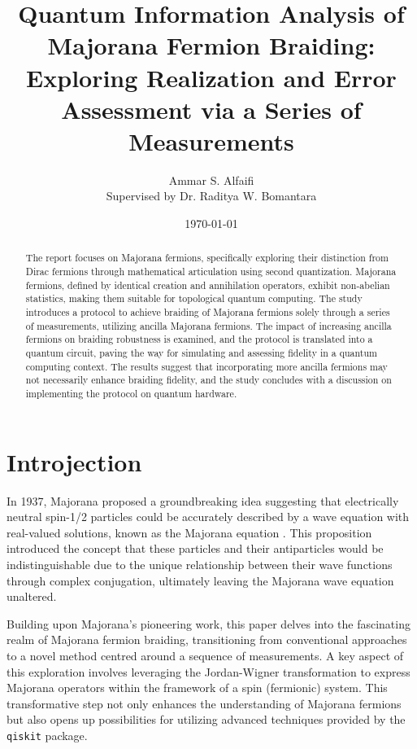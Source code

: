 \documentclass{article}
\title{Quantum Information Analysis of Majorana Fermion Braiding: Exploring Realization and Error Assessment via a Series of Measurements}
\author{Ammar S. Alfaifi \\ Supervised by Dr. Raditya W. Bomantara}
\date{\today}
\def\c#1{\texttt{#1}}
\begin{document}
\maketitle

\begin{abstract}
The report focuses on Majorana fermions, specifically exploring their distinction from Dirac fermions through mathematical articulation using second quantization. Majorana fermions, defined by identical creation and annihilation operators, exhibit non-abelian statistics, making them suitable for topological quantum computing. The study introduces a protocol to achieve braiding of Majorana fermions solely through a series of measurements, utilizing ancilla Majorana fermions. The impact of increasing ancilla fermions on braiding robustness is examined, and the protocol is translated into a quantum circuit, paving the way for simulating and assessing fidelity in a quantum computing context. The results suggest that incorporating more ancilla fermions may not necessarily enhance braiding fidelity, and the study concludes with a discussion on implementing the protocol on quantum hardware.
\end{abstract}

\section{Introjection} %
In 1937, Majorana proposed a groundbreaking idea suggesting that electrically neutral spin-1/2 particles could be accurately described by a wave equation with real-valued solutions, known as the Majorana equation \cite{Majorana2006}. This proposition introduced the concept that these particles and their antiparticles would be indistinguishable due to the unique relationship between their wave functions through complex conjugation, ultimately leaving the Majorana wave equation unaltered.

Building upon Majorana's pioneering work, this paper delves into the fascinating realm of Majorana fermion braiding, transitioning from conventional approaches to a novel method centred around a sequence of measurements. A key aspect of this exploration involves leveraging the Jordan-Wigner transformation to express Majorana operators within the framework of a spin (fermionic) system. This transformative step not only enhances the understanding of Majorana fermions but also opens up possibilities for utilizing advanced techniques provided by the \c{qiskit} package.
\end{document}

